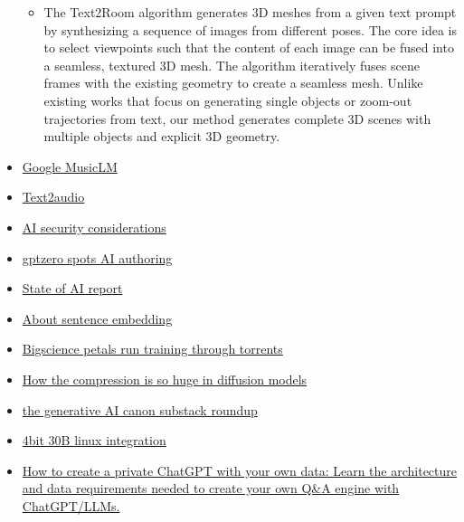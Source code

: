 \begin{itemize}
\begin{itemize}
  \item
    The Text2Room algorithm generates 3D meshes from a given text prompt
    by synthesizing a sequence of images from different poses. The core
    idea is to select viewpoints such that the content of each image can
    be fused into a seamless, textured 3D mesh. The algorithm
    iteratively fuses scene frames with the existing geometry to create
    a seamless mesh. Unlike existing works that focus on generating
    single objects or zoom-out trajectories from text, our method
    generates complete 3D scenes with multiple objects and explicit 3D
    geometry.
  \end{itemize}
\item
  \href{https://google-research.github.io/seanet/musiclm/examples/}{Google
  MusicLM}
\item
  \href{https://text-to-audio.github.io/}{Text2audio}
\item
  \href{https://ico.org.uk/for-organisations/guide-to-data-protection/key-dp-themes/guidance-on-ai-and-data-protection/how-should-we-assess-security-and-data-minimisation-in-ai/}{AI
  security considerations}
\item
  \href{http://gptzero.me/}{gptzero spots AI authoring}
\item
  \href{https://www.stateof.ai/}{State of AI report}
\item
  \href{https://txt.cohere.ai/sentence-word-embeddings/}{About sentence
  embedding}
\item
  \href{https://github.com/bigscience-workshop/petals}{Bigscience petals
  run training through torrents}
\item
  \href{https://medium.com/@socialemail/how-diffusion-models-can-achieve-seemingly-arbitrarily-large-compression-ratios-through-learning-2b21a317a46a}{How
  the compression is so huge in diffusion models}
\item
  \href{https://metavert.substack.com/p/the-generative-ai-canon}{the
  generative AI canon substack roundup}
\item
  \href{https://github.com/oobabooga/text-generation-webui/wiki/LLaMA-model}{4bit
  30B linux integration}
\item
  \href{https://medium.com/@imicknl/how-to-create-a-private-chatgpt-with-your-own-data-15754e6378a1}{How
  to create a private ChatGPT with your own data: Learn the architecture
  and data requirements needed to create your own Q\&A engine with
  ChatGPT/LLMs.}

  \begin{itemize}
  

\end{itemize}
\end{itemize}
